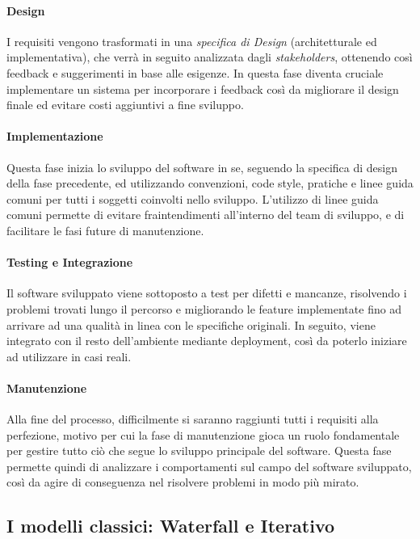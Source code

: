 \documentclass[../main.tex]{subfiles}
\begin{document}
        		\paragraph{Design}
        		I requisiti vengono trasformati in una \emph{specifica di Design} (architetturale ed implementativa), che verrà in seguito analizzata dagli \emph{stakeholders}, ottenendo così feedback e suggerimenti in base alle esigenze. In questa fase diventa cruciale implementare un sistema per incorporare i feedback così da migliorare il design finale ed evitare costi aggiuntivi a fine sviluppo.
        		
        		\paragraph{Implementazione}
        		Questa fase inizia lo sviluppo del software in se, seguendo la specifica di design della fase precedente, ed utilizzando convenzioni, code style, pratiche e linee guida comuni per tutti i soggetti coinvolti nello sviluppo. L'utilizzo di linee guida comuni permette di evitare fraintendimenti all'interno del team di sviluppo, e di facilitare le fasi future di manutenzione.
        		
        		\paragraph{Testing e Integrazione}
        		Il software sviluppato viene sottoposto a test per difetti e mancanze, risolvendo i problemi trovati lungo il percorso e migliorando le feature implementate fino ad arrivare ad una qualità in linea con le specifiche originali. In seguito, viene integrato con il resto dell'ambiente mediante deployment, così da poterlo iniziare ad utilizzare in casi reali.
        		
        		\paragraph{Manutenzione}
        		Alla fine del processo, difficilmente si saranno raggiunti tutti i requisiti alla perfezione, motivo per cui la fase di manutenzione gioca un ruolo fondamentale per gestire tutto ciò che segue lo sviluppo principale del software. Questa fase permette quindi di analizzare i comportamenti sul campo del software sviluppato, così da agire di conseguenza nel risolvere problemi in modo più mirato.
        
        	\subsection{I modelli classici: Waterfall e Iterativo}
        	
\end{document}

